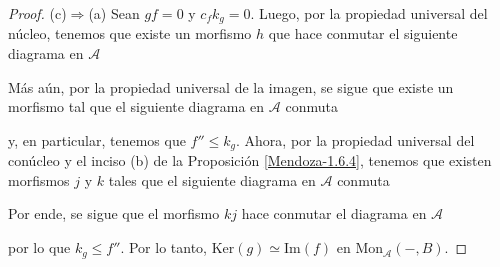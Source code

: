 \documentclass[tesis]{subfiles}
\begin{document}
\begin{proof}
    (c)$\Rightarrow$(a) Sean $gf=0$ y $c_fk_g=0$. Luego, por la propiedad universal del núcleo, tenemos que existe un morfismo $h$ que hace conmutar el siguiente diagrama en $\mathscr{A}$
    \begin{center}
    \end{center}
    Más aún, por la propiedad universal de la imagen, se sigue que existe un morfismo tal que el siguiente diagrama en $\mathscr{A}$ conmuta
    \begin{center}
    \end{center}
    y, en particular, tenemos que $f''\le k_g$. Ahora, por la propiedad universal del conúcleo y el inciso (b) de la Proposición \ref{Mendoza-1.6.4}, tenemos que existen morfismos $j$ y $k$ tales que el siguiente diagrama en $\mathscr{A}$ conmuta
    \begin{center}
    \end{center}
    Por ende, se sigue que el morfismo $kj$ hace conmutar el diagrama en $\mathscr{A}$
    \begin{center}
    \end{center}
    por lo que $k_g\le f''$. Por lo tanto, $\text{Ker}(g)\simeq\text{Im}(f)$ en $\text{Mon}_\mathscr{A}(-,B)$.
\end{proof}
\end{document}
